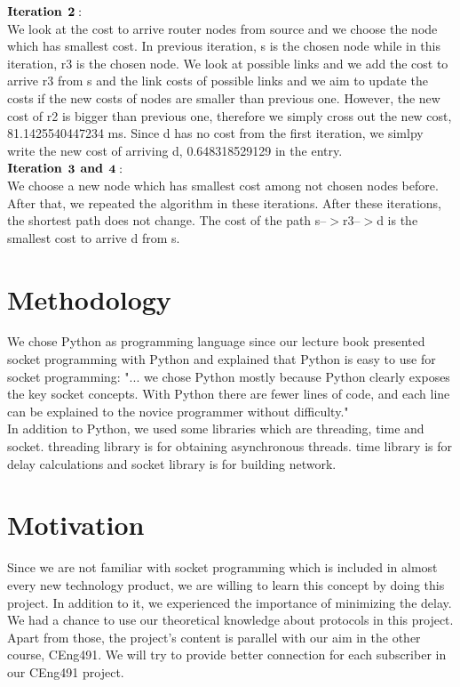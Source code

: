 \documentclass[conference]{IEEEtran}
\begin{document}
$\bold{Iteration}$ $\bold{2:}$ \\

We look at the cost to arrive router nodes from source and we choose the node which has smallest cost. In previous iteration, s is the chosen node while in this iteration, r3 is the chosen node. We look at possible links and we add the cost to arrive r3 from s and the link costs of possible links and we aim to update the costs if the new costs of nodes are smaller than previous one. However, the new cost of r2 is bigger than previous one, therefore we simply cross out the new cost, 81.1425540447234 ms. Since d has no cost from the first iteration, we simlpy write the new cost of arriving d, 0.648318529129 in the entry. \\

$\bold{Iteration}$ $\bold{3}$ $\bold{and}$ $\bold{4:}$ \\

We choose a new node which has smallest cost among not chosen nodes before. After that, we repeated the algorithm in these iterations. After these iterations, the shortest path does not change. The cost of the path s--$> $r3--$> $d is the smallest cost to arrive d from s. \\

\section{Methodology}

We chose Python as programming language since our lecture book presented socket programming with Python and explained that Python is easy to use for socket programming: "... we chose Python mostly because Python clearly exposes the key socket concepts. With Python there are fewer lines of code, and each line can be explained to the novice programmer without difficulty." \\

In addition to Python, we used some libraries which are threading, time and socket. threading library is for obtaining asynchronous threads. time library is for delay calculations and socket library is for building network. \\

\section{Motivation}

Since we are not familiar with socket programming which is included in almost every new technology product, we are willing to learn this concept by doing this project. In addition to it, we experienced the importance of minimizing the delay. We had a chance to use our theoretical knowledge about protocols in this project. Apart from those, the project's content is parallel with our aim in the other course, CEng491. We will try to provide better connection for each subscriber in our CEng491 project. \\
\end{document}
